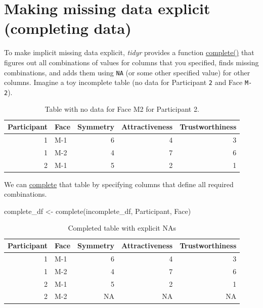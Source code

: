 \documentclass[
]{book}
\newenvironment{Shaded}{\begin{snugshade}}{\end{snugshade}}
\newcommand{\FunctionTok}[1]{\textcolor[rgb]{0.00,0.00,0.00}{#1}}
\newcommand{\NormalTok}[1]{#1}
\newcommand{\OtherTok}[1]{\textcolor[rgb]{0.56,0.35,0.01}{#1}}
\begin{document}
\hypertarget{complete}{%
\section{Making missing data explicit (completing data)}\label{complete}}

To make implicit missing data explicit, \emph{tidyr} provides a function \href{https://tidyr.tidyverse.org/reference/complete.html}{complete()} that figures out all combinations of values for columns that you specified, finds missing combinations, and adds them using \texttt{NA} (or some other specified value) for other columns. Imagine a toy incomplete table (no data for Participant \texttt{2} and Face \texttt{M-2}).

\begin{table}

\caption{\label{tab:unnamed-chunk-274}Table with no data for Face M2 for Participant 2.}
\centering
\begin{tabular}[t]{r|l|r|r|r}
\hline
Participant & Face & Symmetry & Attractiveness & Trustworthiness\\
\hline
1 & M-1 & 6 & 4 & 3\\
\hline
1 & M-2 & 4 & 7 & 6\\
\hline
2 & M-1 & 5 & 2 & 1\\
\hline
\end{tabular}
\end{table}

We can \href{https://tidyr.tidyverse.org/reference/complete.html}{complete} that table by specifying columns that define all required combinations.

\begin{Shaded}
\begin{Highlighting}[]
\NormalTok{complete\_df }\OtherTok{\textless{}{-}} \FunctionTok{complete}\NormalTok{(incomplete\_df, Participant, Face)}
\end{Highlighting}
\end{Shaded}

\begin{table}

\caption{\label{tab:unnamed-chunk-276}Completed table with explicit NAs}
\centering
\begin{tabular}[t]{r|l|r|r|r}
\hline
Participant & Face & Symmetry & Attractiveness & Trustworthiness\\
\hline
1 & M-1 & 6 & 4 & 3\\
\hline
1 & M-2 & 4 & 7 & 6\\
\hline
2 & M-1 & 5 & 2 & 1\\
\hline
2 & M-2 & NA & NA & NA\\
\hline
\end{tabular}
\end{table}
\end{document}
